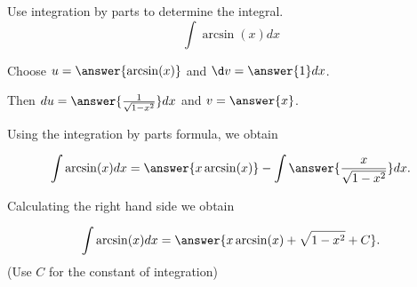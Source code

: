 \documentclass{ximera}
\author{Jason Miller and Jim Talamo}
\begin{document}
\begin{exercise}
Use integration by parts to determine the integral.
\[
\int \arcsin(x) dx 
\]


Choose $u=\answer{ \arcsin(x) }$ and $\d v=\answer{1 } dx$. 

Then $du= \answer{ \frac{1}{\sqrt{1-x^{2}}} } dx$ and $v= \answer{x}$.

Using the integration by parts formula, we obtain

\[
\int \arcsin(x) dx= \answer{x\arcsin(x)} - \int \answer{ \frac{x}{\sqrt{1-x^{2}}} } dx.
\]

Calculating the right hand side we obtain

\[
\int \arcsin(x) dx= \answer{x\arcsin(x)+\sqrt{1-x^2}+C}.
\]
(Use $C$ for the constant of integration)

\end{exercise}
\end{document}
